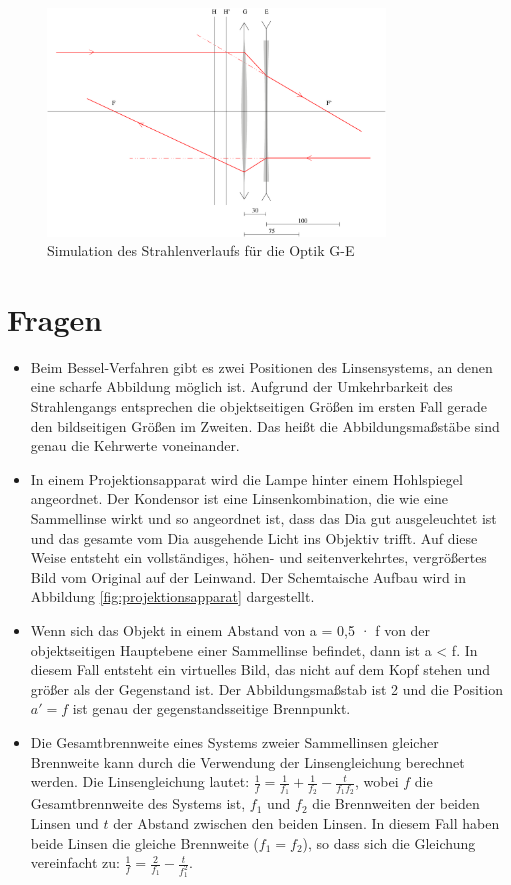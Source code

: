 \documentclass[11pt, a4paper]{article}
\begin{document}
    \begin{figure}[h]
        \centering
        \includegraphics[width=0.8\textwidth]{G-E-30.pdf}
        \caption{Simulation des Strahlenverlaufs für die Optik G-E}
        \label{fig:fit2}
    \end{figure}

    \section{Fragen}
    \begin{itemize}
        \item Beim Bessel-Verfahren gibt es zwei Positionen des Linsensystems, an denen eine scharfe Abbildung möglich ist. Aufgrund der Umkehrbarkeit des Strahlengangs entsprechen die objektseitigen Größen im ersten Fall gerade den bildseitigen Größen im Zweiten. Das heißt die Abbildungsmaßstäbe sind genau die Kehrwerte voneinander.
        \item In einem Projektionsapparat wird die Lampe hinter einem Hohlspiegel angeordnet. Der Kondensor ist eine Linsenkombination, die wie eine Sammellinse wirkt und so angeordnet ist, dass das Dia gut ausgeleuchtet ist und das gesamte vom Dia ausgehende Licht ins Objektiv trifft. Auf diese Weise entsteht ein vollständiges, höhen- und seitenverkehrtes, vergrößertes Bild vom Original auf der Leinwand. Der Schemtaische Aufbau wird in Abbildung \ref{fig:projektionsapparat} dargestellt.
        \item Wenn sich das Objekt in einem Abstand von a = 0,5 · f von der objektseitigen Hauptebene einer Sammellinse befindet, dann ist a < f. In diesem Fall entsteht ein virtuelles Bild, das nicht auf dem Kopf stehen und größer als der Gegenstand ist. Der Abbildungsmaßstab ist 2 und die Position $a'= f$ ist genau der gegenstandsseitige Brennpunkt.
        \item Die Gesamtbrennweite eines Systems zweier Sammellinsen gleicher Brennweite kann durch die Verwendung der Linsengleichung berechnet werden. Die Linsengleichung lautet: $\frac{1}{f} = \frac{1}{f_1} + \frac{1}{f_2} - \frac{t}{f_1 f_2}$, wobei $f$ die Gesamtbrennweite des Systems ist, $f_1$ und $f_2$ die Brennweiten der beiden Linsen und $t$ der Abstand zwischen den beiden Linsen.
        In diesem Fall haben beide Linsen die gleiche Brennweite ($f_1 = f_2$), so dass sich die Gleichung vereinfacht zu: $\frac{1}{f} = \frac{2}{f_1} - \frac{t}{f^2_1}$. 
    \end{itemize}
\end{document}
